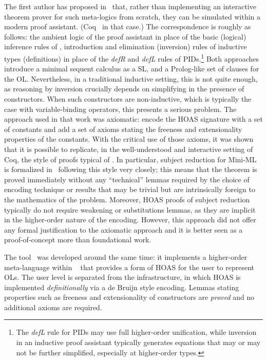 \documentclass[final]{svjour3}
\begin{document}
The first author has proposed in~\cite{Felty02} that, rather than
implementing an interactive theorem prover for such meta-logics from
scratch, they can be simulated within a modern proof assistant.
(Coq~\cite{bertot/casteran:2004} in that case.)  The correspondence is
roughly as follows: the ambient logic of the proof assistant in place
of the basic (logical) inference rules of , introduction and
elimination (inversion) rules of inductive types (definitions) in
place of the \emph{defR} and \emph{defL} rules of PIDs.\footnote{The
  \emph{defL} rule for PIDs may use full higher-order unification,
  while inversion in an inductive proof assistant typically generates
  equations that may or may not be further simplified, especially at
  higher-order types.}  Both approaches introduce a minimal sequent calculus
\cite{JoMinLog} as a SL, and a Prolog-like set of clauses for the
OL\@.  Nevertheless, in a traditional inductive setting, this is not
quite enough, as reasoning by inversion crucially depends on
simplifying in the presence of constructors. When such constructors
are non-inductive, which is typically the case with variable-binding
operators, this presents a serious problem.  The approach used in that
work was axiomatic: encode the HOAS signature with  a set of constants
and add a set of axioms stating the freeness and extensionality
properties of the constants.  With the critical use of those axioms,
it was shown that it is possible to replicate, in the well-understood
and interactive setting of Coq, the style of proofs typical of
.  In particular, subject reduction for Mini-ML is formalized
in~\cite{Felty02} following this style very closely; this means that
the theorem is proved immediately without any ``technical'' lemmas
required by the choice of encoding technique or results that may be
trivial but are intrinsically foreign to the mathematics of the
problem. Moreover, HOAS proofs of subject reduction typically do not
require weakening or substitutions lemmas, as they are implicit in the
higher-order nature of the encoding. However, this approach did not
offer any formal justification to the axiomatic approach and it is
better seen as a proof-of-concept more than foundational work.

The \hybrid tool~\cite{Ambler02} was developed around the same time:
it implements a higher-order meta-language within
\HOL~\cite{Nipkow-Paulson-Wenzel:2002} that provides a form of HOAS
for the user to represent OLs.  The user level is separated from the
infrastructure, in which HOAS is implemented \emph{definitionally} via
a de Bruijn style encoding.  Lemmas stating properties such as
freeness and extensionality of constructors are \emph{proved} and no
additional axioms are required.
\end{document}
